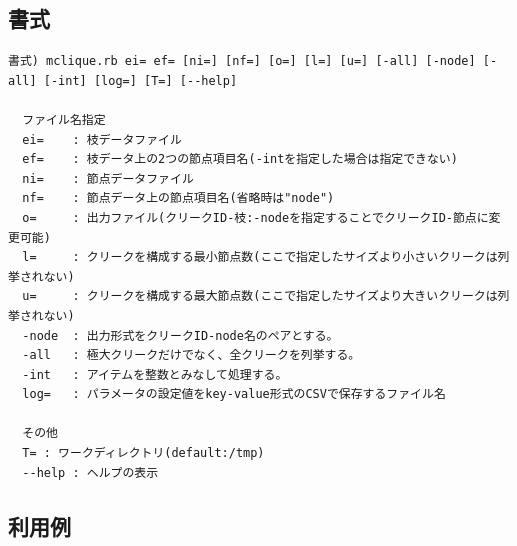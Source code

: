 \subsection{書式}
\begin{verbatim}
書式) mclique.rb ei= ef= [ni=] [nf=] [o=] [l=] [u=] [-all] [-node] [-all] [-int] [log=] [T=] [--help]

  ファイル名指定
  ei=    : 枝データファイル
  ef=    : 枝データ上の2つの節点項目名(-intを指定した場合は指定できない)
  ni=    : 節点データファイル
  nf=    : 節点データ上の節点項目名(省略時は"node")
  o=     : 出力ファイル(クリークID-枝:-nodeを指定することでクリークID-節点に変更可能)
  l=     : クリークを構成する最小節点数(ここで指定したサイズより小さいクリークは列挙されない)
  u=     : クリークを構成する最大節点数(ここで指定したサイズより大きいクリークは列挙されない)
  -node  : 出力形式をクリークID-node名のペアとする。
  -all   : 極大クリークだけでなく、全クリークを列挙する。
  -int   : アイテムを整数とみなして処理する。
  log=   : パラメータの設定値をkey-value形式のCSVで保存するファイル名

  その他
  T= : ワークディレクトリ(default:/tmp)
  --help : ヘルプの表示
\end{verbatim}

\subsection{利用例}



